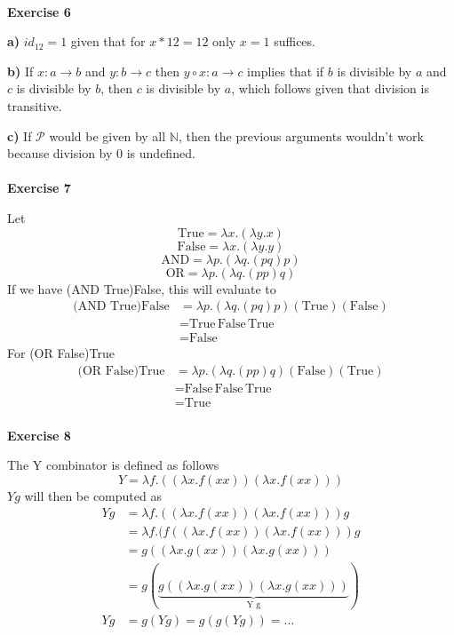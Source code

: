 \documentclass[a4paper,12pt,twoside,leqno]{article}
\begin{document}
\paragraph*{}
\textbf{Exercise 6}\par 
\textbf{a)} $id_{12} = 1$ given that for $x * 12 = 12$ only $x = 1$ suffices.\par
\textbf{b)} If $x: a \rightarrow b$ and $y: b \rightarrow c$ then $y \circ x: a \rightarrow c$ implies that if $b$ is divisible by $a$ and $c$ is divisible by $b$, then $c$ is divisible by $a$, which follows given that division is transitive. \par 
\textbf{c)} If $\mathcal{P}$ would be given by all $\mathbb{N}$, then the previous arguments wouldn't work because division by 0 is undefined.
\paragraph*{}
\textbf{Exercise 7}\par
Let
$$
\textrm{True} = \lambda x. (\lambda y.x)
$$ 
$$
\textrm{False} = \lambda x. (\lambda y.y)
$$
$$
\textrm{AND} = \lambda p. (\lambda q.(pq)p)
$$
$$
\textrm{OR} = \lambda p. (\lambda q.(pp)q)
$$
If we have (AND True)False, this will evaluate to
\begin{align*}
\textrm{(AND True)False} &= \lambda p. (\lambda q.(pq)p)(\textrm{True})(\textrm{False})\\
&= \textrm{True}\, \textrm{False} \,\textrm{True}\\ &= \textrm{False}
\end{align*}
For (OR False)True
\begin{align*}
\textrm{(OR False)True} &= \lambda p. (\lambda q.(pp)q)(\textrm{False})(\textrm{True})\\
&= \textrm{False}\, \textrm{False} \,\textrm{True}\\ &= \textrm{True}
\end{align*}
\paragraph*{}
\textbf{Exercise 8}\par
The Y combinator is defined as follows
$$
Y = \lambda f.((\lambda x.f(xx))(\lambda x.f(xx)))
$$
$Y g$ will then be computed as
\begin{align*}
Y g &= \lambda f.((\lambda x.f(xx))(\lambda x.f(xx)))g \\
& = \lambda f.(f((\lambda x.f(xx))(\lambda x.f(xx)))g\\
& = g((\lambda x.g(xx))(\lambda x.g(xx)))\\
& = g(\underbrace{g((\lambda x.g(xx))(\lambda x.g(xx)))}_\text{Y g})\\
Y g &= g(Y g) = g(g(Y g)) = \dots
\end{align*}
\end{document}
